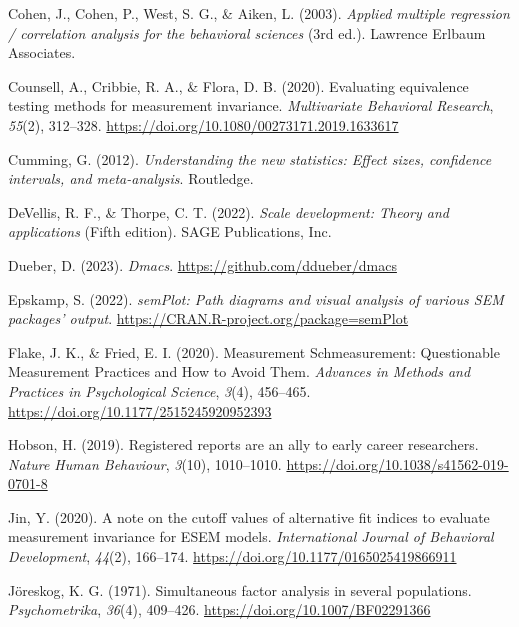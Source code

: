 \documentclass[
  man]{apa7}
\newlength{\cslhangindent}
\newlength{\cslentryspacingunit} %
\newenvironment{CSLReferences}[2] %
 {%
  \setlength{\parindent}{0pt}
  \ifodd #1
  \let\oldpar\par
  \def\par{\hangindent=\cslhangindent\oldpar}
  \fi
  \setlength{\parskip}{#2\cslentryspacingunit}
 }%
 {}
\begin{document}
\begin{CSLReferences}{1}{0}
\leavevmode{}%
Cohen, J., Cohen, P., West, S. G., \& Aiken, L. (2003). \emph{Applied multiple regression / correlation analysis for the behavioral sciences} (3rd ed.). Lawrence Erlbaum Associates.

\leavevmode{}%
Counsell, A., Cribbie, R. A., \& Flora, D. B. (2020). Evaluating equivalence testing methods for measurement invariance. \emph{Multivariate Behavioral Research}, \emph{55}(2), 312--328. \url{https://doi.org/10.1080/00273171.2019.1633617}

\leavevmode{}%
Cumming, G. (2012). \emph{Understanding the new statistics: Effect sizes, confidence intervals, and meta-analysis}. Routledge.

\leavevmode{}%
DeVellis, R. F., \& Thorpe, C. T. (2022). \emph{Scale development: Theory and applications} (Fifth edition). SAGE Publications, Inc.

\leavevmode{}%
Dueber, D. (2023). \emph{Dmacs}. \url{https://github.com/ddueber/dmacs}

\leavevmode{}%
Epskamp, S. (2022). \emph{semPlot: Path diagrams and visual analysis of various SEM packages' output}. \url{https://CRAN.R-project.org/package=semPlot}

\leavevmode{}%
Flake, J. K., \& Fried, E. I. (2020). Measurement Schmeasurement: Questionable Measurement Practices and How to Avoid Them. \emph{Advances in Methods and Practices in Psychological Science}, \emph{3}(4), 456--465. \url{https://doi.org/10.1177/2515245920952393}

\leavevmode{}%
Hobson, H. (2019). Registered reports are an ally to early career researchers. \emph{Nature Human Behaviour}, \emph{3}(10), 1010--1010. \url{https://doi.org/10.1038/s41562-019-0701-8}

\leavevmode{}%
Jin, Y. (2020). A note on the cutoff values of alternative fit indices to evaluate measurement invariance for ESEM models. \emph{International Journal of Behavioral Development}, \emph{44}(2), 166--174. \url{https://doi.org/10.1177/0165025419866911}

\leavevmode{}%
Jöreskog, K. G. (1971). Simultaneous factor analysis in several populations. \emph{Psychometrika}, \emph{36}(4), 409--426. \url{https://doi.org/10.1007/BF02291366}


\end{CSLReferences}
\end{document}
